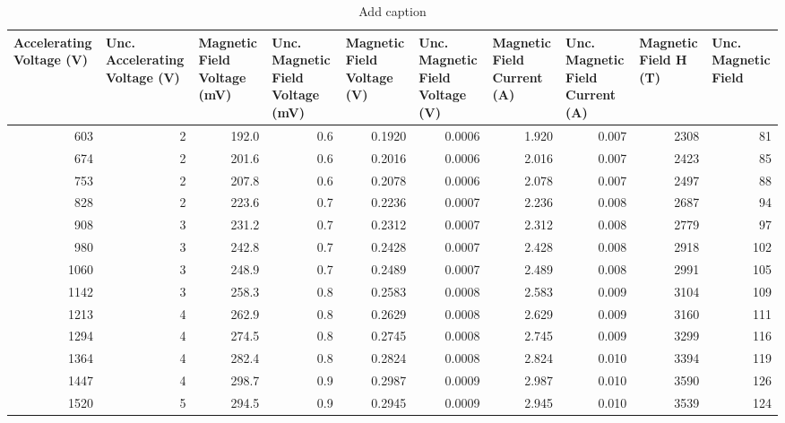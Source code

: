 \begin{table}[htbp]
  \centering
  \caption{Add caption}
    \begin{tabular}{rrrrrrrrrr}
    \toprule
    \multicolumn{1}{l}{\textbf{Accelerating Voltage (V)}} & \multicolumn{1}{l}{\textbf{Unc. Accelerating Voltage (V)}} & \multicolumn{1}{l}{\textbf{Magnetic Field Voltage (mV)}} & \multicolumn{1}{l}{\textbf{Unc. Magnetic Field Voltage (mV)}} & \multicolumn{1}{l}{\textbf{Magnetic Field Voltage (V)}} & \multicolumn{1}{l}{\textbf{Unc. Magnetic Field Voltage (V)}} & \multicolumn{1}{l}{\textbf{Magnetic Field Current (A)}} & \multicolumn{1}{l}{\textbf{Unc. Magnetic Field Current (A)}} & \multicolumn{1}{l}{\textbf{Magnetic Field H (T)}} & \multicolumn{1}{l}{\textbf{Unc. Magnetic Field}} \\
    \midrule
    \rowcolor[rgb]{ .851,  .851,  .851} 603   & 2     & 192.0 & 0.6   & 0.1920 & 0.0006 & 1.920 & 0.007 & 2308  & 81 \\
    674   & 2     & 201.6 & 0.6   & 0.2016 & 0.0006 & 2.016 & 0.007 & 2423  & 85 \\
    \rowcolor[rgb]{ .851,  .851,  .851} 753   & 2     & 207.8 & 0.6   & 0.2078 & 0.0006 & 2.078 & 0.007 & 2497  & 88 \\
    828   & 2     & 223.6 & 0.7   & 0.2236 & 0.0007 & 2.236 & 0.008 & 2687  & 94 \\
    \rowcolor[rgb]{ .851,  .851,  .851} 908   & 3     & 231.2 & 0.7   & 0.2312 & 0.0007 & 2.312 & 0.008 & 2779  & 97 \\
    980   & 3     & 242.8 & 0.7   & 0.2428 & 0.0007 & 2.428 & 0.008 & 2918  & 102 \\
    \rowcolor[rgb]{ .851,  .851,  .851} 1060  & 3     & 248.9 & 0.7   & 0.2489 & 0.0007 & 2.489 & 0.008 & 2991  & 105 \\
    1142  & 3     & 258.3 & 0.8   & 0.2583 & 0.0008 & 2.583 & 0.009 & 3104  & 109 \\
    \rowcolor[rgb]{ .851,  .851,  .851} 1213  & 4     & 262.9 & 0.8   & 0.2629 & 0.0008 & 2.629 & 0.009 & 3160  & 111 \\
    1294  & 4     & 274.5 & 0.8   & 0.2745 & 0.0008 & 2.745 & 0.009 & 3299  & 116 \\
    \rowcolor[rgb]{ .851,  .851,  .851} 1364  & 4     & 282.4 & 0.8   & 0.2824 & 0.0008 & 2.824 & 0.010 & 3394  & 119 \\
    1447  & 4     & 298.7 & 0.9   & 0.2987 & 0.0009 & 2.987 & 0.010 & 3590  & 126 \\
    \rowcolor[rgb]{ .851,  .851,  .851} 1520  & 5     & 294.5 & 0.9   & 0.2945 & 0.0009 & 2.945 & 0.010 & 3539  & 124 \\
    \bottomrule
    \end{tabular}%
  \label{tab:addlabel}%
\end{table}%
